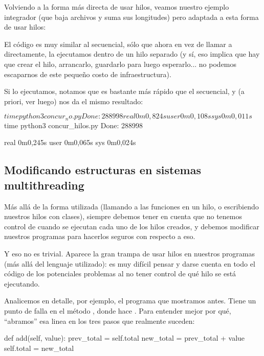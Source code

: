 Volviendo a la forma más directa de usar hilos, veamos nuestro ejemplo integrador (que baja archivos y suma sus longitudes) pero adaptada a esta forma de usar hilos:


El código es muy similar al secuencial, sólo que ahora en vez de llamar a  directamente, la ejecutamos dentro de un hilo separado (y sí, eso implica que hay que crear el hilo, arrancarlo, guardarlo para luego esperarlo... no podemos escaparnos de este pequeño costo de infraestructura).

Si lo ejecutamos, notamos que es bastante más rápido que el secuencial, y (a priori, ver luego) nos da el mismo resultado:

\begin{shell}
$ time python3 concur_no.py
Done: 288998

real    0m0,824s
user    0m0,108s
sys     0m0,011s
$ time python3 concur_hilos.py
Done: 288998

real    0m0,245s
user    0m0,065s
sys     0m0,024s
\end{shell}


\subsection{Modificando estructuras en sistemas multithreading}

Más allá de la forma utilizada (llamando a las funciones en un hilo, o escribiendo nuestros hilos con clases), siempre debemos tener en cuenta que no tenemos control de cuando se ejecutan cada uno de los hilos creados, y debemos modificar nuestros programas para hacerlos seguros con respecto a eso.

Y eso no es trivial. Aparece la gran trampa de usar hilos en nuestros programas (más allá del lenguaje utilizado): es muy difícil pensar y darse cuenta en todo el código de los potenciales problemas al no tener control de qué hilo se está ejecutando.

Analicemos en detalle, por ejemplo, el programa que mostramos antes. Tiene un punto de falla en el método , donde hace . Para entender mejor por qué, ``abramos'' esa linea en los tres pasos que realmente suceden:

\begin{py}
def add(self, value):
    prev_total = self.total
    new_total = prev_total + value
    self.total = new_total
\end{py}

